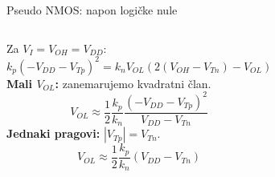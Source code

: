 \begin{frame}[label=09_2-s021]{Pseudo NMOS: napon logičke nule}
\begin{columns}[T,onlytextwidth]\centering {}Za $V_I=V_{OH}=V_{DD}$:\[k_p(-V_{DD}-V_{Tp})^2=k_nV_{OL}\left(2(V_{OH}-V_{Tn})-V_{OL}\right)\]
\textbf{Mali $V_{OL}$:} zanemarujemo kvadratni član.\[V_{OL}\approx\frac12\frac{k_p}{k_n}\frac{(-V_{DD}-V_{Tp})^2}{V_{DD}-V_{Tn}}\]
\textbf{Jednaki pragovi:} $|V_{Tp}|=V_{Tn}$.\[V_{OL}\approx\frac12\frac{k_p}{k_n}(V_{DD}-V_{Tn})\]
\end{columns}
\end{frame}
